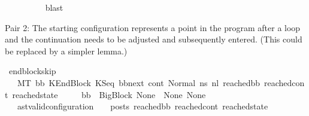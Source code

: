 \begin{isabellebody}
\ \ \ \ \ \ \ \ \isamarkupfalse%
\ blast\isanewline
\ \ \ \ \isamarkupfalse%
\isanewline
\ \ \isamarkupfalse%
\isanewline
{}\isamarkupfalse%
%
\endisatagproof
{\isafoldproof}%
%
\isadelimproof
%
\endisadelimproof
%
\begin{isamarkuptext}%
Pair 2: The starting configuration represents a point in the program after a loop and the 
              continuation needs to be adjusted and subsequently entered.
              (This could be replaced by a simpler lemma.)%
\end{isamarkuptext}\isamarkuptrue%
\isamarkupfalse%
\ endblock{\isacharunderscore}{\kern0pt}skip{}{\isacharcolon}{\kern0pt}\isanewline
\ \ \ {\isachardoublequoteopen}M{\isacharcomma}{\kern0pt}{\isasymLambda}{\isacharcomma}{\kern0pt}{\isasymGamma}{\isacharcomma}{\kern0pt}{\isasymOmega}{\isacharcomma}{\kern0pt}T\ {\isasymturnstile}{\isacharparenleft}{\kern0pt}bb{}{\isacharcomma}{\kern0pt}\ KEndBlock\ {\isacharparenleft}{\kern0pt}KSeq\ bb{\isacharunderscore}{\kern0pt}next\ cont{}{\isacharparenright}{\kern0pt}{\isacharcomma}{\kern0pt}\ Normal\ ns{}{\isacharparenright}{\kern0pt}\ {\isacharminus}{\kern0pt}n{\isasymlongrightarrow}{\isacharcircum}{\kern0pt}l\ {\isacharparenleft}{\kern0pt}reached{\isacharunderscore}{\kern0pt}bb{\isacharcomma}{\kern0pt}\ reached{\isacharunderscore}{\kern0pt}cont{\isacharcomma}{\kern0pt}\ reached{\isacharunderscore}{\kern0pt}state{\isacharparenright}{\kern0pt}{\isachardoublequoteclose}\isanewline
\ \ \ \ \ {\isachardoublequoteopen}bb{}\ {\isacharequal}{\kern0pt}\ BigBlock\ None\ {\isacharbrackleft}{\kern0pt}{\isacharbrackright}{\kern0pt}\ None\ None{\isachardoublequoteclose}\ \isanewline
\ \ \ {\isachardoublequoteopen}{\isacharparenleft}{\kern0pt}ast{\isacharunderscore}{\kern0pt}valid{\isacharunderscore}{\kern0pt}configuration\ {\isasymLambda}\ {\isasymGamma}\ {\isasymOmega}\ posts\ reached{\isacharunderscore}{\kern0pt}bb\ reached{\isacharunderscore}{\kern0pt}cont\ reached{\isacharunderscore}{\kern0pt}state{\isacharparenright}{\kern0pt}\ {\isasymor}\ \isanewline

\end{isabellebody}

